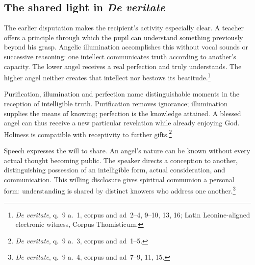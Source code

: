 \subsection{The shared light in \emph{De veritate}}

The earlier disputation makes the recipient's activity especially clear.
A teacher offers a principle through which the pupil can understand something
previously beyond his grasp. Angelic illumination accomplishes this without
vocal sounds or successive reasoning: one intellect communicates truth
according to another's capacity. The lower angel receives a real perfection
and truly understands. The higher angel neither creates that intellect nor
bestows its beatitude.\footnote{\emph{De veritate}, q.~9 a.~1,
corpus and ad~2--4, 9--10, 13, 16; Latin Leonine-aligned electronic witness,
Corpus Thomisticum.}

Purification, illumination and perfection name distinguishable moments in
the reception of intelligible truth. Purification removes ignorance;
illumination supplies the means of knowing; perfection is the knowledge
attained. A blessed angel can thus receive a new particular revelation while
already enjoying God. Holiness is compatible with receptivity to further
gifts.\footnote{\emph{De veritate}, q.~9 a.~3, corpus and ad~1--5.}

Speech expresses the will to share. An angel's nature can be known without
every actual thought becoming public. The speaker directs a conception to
another, distinguishing possession of an intelligible form, actual
consideration, and communication. This willing disclosure gives spiritual
communion a personal form: understanding is shared by distinct knowers who
address one another.\footnote{\emph{De veritate}, q.~9 a.~4, corpus
and ad~7--9, 11, 15.}
